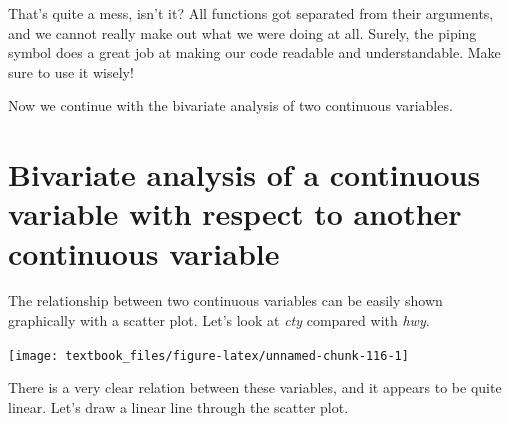 \documentclass[]{tufte-book}
\newenvironment{Shaded}{}{}
\newcommand{\DataTypeTok}[1]{\textcolor[rgb]{0.56,0.13,0.00}{#1}}
\newcommand{\KeywordTok}[1]{\textcolor[rgb]{0.00,0.44,0.13}{\textbf{#1}}}
\newcommand{\NormalTok}[1]{#1}
\newcommand{\OperatorTok}[1]{\textcolor[rgb]{0.40,0.40,0.40}{#1}}
\newcommand{\StringTok}[1]{\textcolor[rgb]{0.25,0.44,0.63}{#1}}
\begin{document}
That's quite a mess, isn't it? All functions got separated from their arguments, and we cannot really make out what we were doing at all. Surely, the piping symbol does a great job at making our code readable and understandable. Make sure to use it wisely!

Now we continue with the bivariate analysis of two continuous variables.

\hypertarget{bivariate-analysis-of-a-continuous-variable-with-respect-to-another-continuous-variable}{%
\section{Bivariate analysis of a continuous variable with respect to another continuous variable}\label{bivariate-analysis-of-a-continuous-variable-with-respect-to-another-continuous-variable}}

The relationship between two continuous variables can be easily shown graphically with a scatter plot. Let's look at \emph{cty} compared with \emph{hwy}.

\begin{Shaded}
\end{Shaded}

\texttt{[image: textbook\_files/figure-latex/unnamed-chunk-116-1]}

There is a very clear relation between these variables, and it appears to be quite linear. Let's draw a linear line through the scatter plot.

\begin{Shaded}
\end{Shaded}
\end{document}
